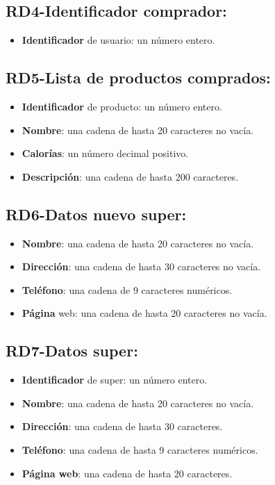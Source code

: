 \documentclass[a4paper,12pt]{report}
\begin{document}
\subsection{RD4-Identificador comprador:}
\label{sec-2-1-4}
\begin{itemize}
\item \textbf{Identificador} de usuario: un número entero.
\end{itemize}
\subsection{RD5-Lista de productos comprados:}
\label{sec-2-1-5}
\begin{itemize}
\item \textbf{Identificador} de producto: un número entero.
\item \textbf{Nombre}: una cadena de hasta 20 caracteres no vacía.
\item \textbf{Calorías}: un número decimal positivo.
\item \textbf{Descripción}: una cadena de hasta 200 caracteres.
\end{itemize}
\subsection{RD6-Datos nuevo super:}
\label{sec-2-1-6}
\begin{itemize}
\item \textbf{Nombre}:  una cadena de hasta 20 caracteres no vacía.
\item \textbf{Dirección}:  una cadena de hasta 30 caracteres no vacía.
\item \textbf{Teléfono}: una cadena de 9 caracteres numéricos.
\item \textbf{Página} web: una cadena de hasta 20 caracteres no vacía.
\end{itemize}
\subsection{RD7-Datos super:}
\label{sec-2-1-7}
\begin{itemize}
\item \textbf{Identificador} de super: un número entero.
\item \textbf{Nombre}:  una cadena de hasta 20 caracteres no vacía.
\item \textbf{Dirección}:  una cadena de hasta 30 caracteres.
\item \textbf{Teléfono}: una cadena de hasta 9 caracteres numéricos.
\item \textbf{Página web}: una cadena de hasta 20 caracteres.
\end{itemize}
\end{document}
